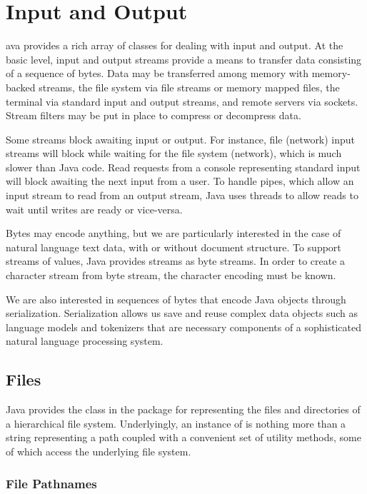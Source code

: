 \chapter{Input and Output}\label{chap:io}

ava provides a rich array of classes for dealing with
input and output.  At the basic level, input and output streams
provide a means to transfer data consisting of a sequence of bytes.
Data may be transferred among memory with memory-backed streams, the
file system via file streams or memory mapped files, the terminal via
standard input and output streams, and remote servers via sockets.
Stream filters may be put in place to compress or decompress data.

Some streams block awaiting input or output.  For instance, file
(network) input streams will block while waiting for the file system
(network), which is much slower than Java code.  Read requests from a
console representing standard input will block awaiting the next input
from a user.  To handle pipes, which allow an input stream to read
from an output stream, Java uses threads to allow reads to wait until
writes are ready or vice-versa.  

Bytes may encode anything, but we are particularly interested in the
case of natural language text data, with or without document
structure.  To support streams of  values, Java provides
 streams as byte streams.  In order to create a character
stream from byte stream, the character encoding must be known.

We are also interested in sequences of bytes that encode Java objects
through serialization.  Serialization allows us save and reuse complex
data objects such as language models and tokenizers that are necessary
components of a sophisticated natural language processing system.

\section{Files}

Java provides the class  in the  package for
representing the files and directories of a hierarchical file system.
Underlyingly, an instance of  is nothing more than a string
representing a path coupled with a convenient set of utility methods,
some of which access the underlying file system.  

\subsection{File Pathnames}

